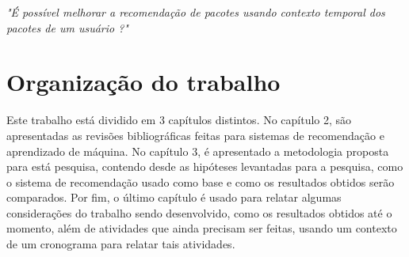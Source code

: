\textit{"É possível melhorar a recomendação de pacotes usando contexto temporal
dos pacotes de um usuário ?"}

\section{Organização do trabalho}

Este trabalho está dividido em 3 capítulos distintos. No capítulo 2,
são apresentadas as revisões bibliográficas feitas para sistemas de recomendação e aprendizado de máquina.
No capítulo 3, é apresentado a metodologia proposta para está pesquisa, contendo desde as hipóteses levantadas para a pesquisa,
 como o sistema de recomendação usado como base e como os resultados obtidos serão comparados. Por fim, o último capítulo é usado para relatar
algumas considerações do trabalho sendo desenvolvido, como os resultados obtidos até o momento, além de atividades que ainda precisam ser feitas,
usando um contexto de um cronograma para relatar tais atividades.
